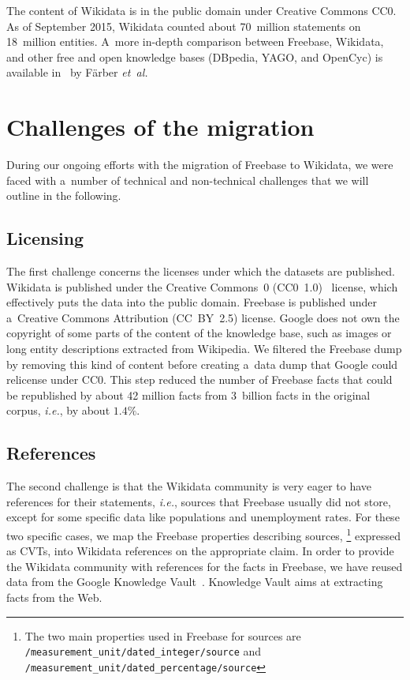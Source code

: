 \documentclass{sig-alternate-2013}
\begin{document}
The content of Wikidata is in the public domain under Creative Commons CC0.
As of September 2015, Wikidata counted about 70~million statements on 18~million entities.
A~more in-depth comparison between Freebase, Wikidata, and other free and open knowledge bases
(DBpedia, YAGO, and OpenCyc) is available in~\cite{farbercomparative} by Färber \emph{et~al.}

\section{Challenges of the migration}\label{sec:challenges-of-the-migration}

During our ongoing efforts with the migration of Freebase to Wikidata,
we were faced with a~number of technical and non-technical challenges
that we will outline in the following.

\subsection{Licensing}
\label{sec:licensing}

The first challenge concerns the licenses under which the datasets are published.
Wikidata is published under the Creative Commons~0 (CC0~1.0)~\cite{cc0} license,
which effectively puts the data into the public domain.
Freebase is published under a~Creative Commons Attribution (CC~BY~2.5) license.
Google does not own the copyright of some parts of the content of the knowledge base,
such as images or long entity descriptions extracted from Wikipedia.
We filtered the Freebase dump by removing this kind of content
before creating a~data dump that Google could relicense under CC0.
This step reduced the number of Freebase facts that could be republished by about 42 million facts
from 3~billion facts in the original corpus, \emph{i.e.}, by about $1.4\%$.

\subsection{References}

The second challenge is that the Wikidata community is very eager to have references
for their statements, \emph{i.e.}, sources that Freebase usually did not store,
except for some specific data like populations and unemployment rates.
For these two specific cases, we map the Freebase properties describing sources,%
\footnote{The two main properties used in Freebase for sources are
\texttt{/measurement\_unit/dated\_integer/source} and
\texttt{/measurement\_unit/dated\_percentage/source}}
expressed as CVTs, into Wikidata references on the appropriate claim.
In order to provide the Wikidata community with references for the facts in Freebase,
we have reused data from the Google
Knowledge Vault~\cite{dong2014knowledge}. Knowledge Vault aims at extracting facts from the Web.
\end{document}
